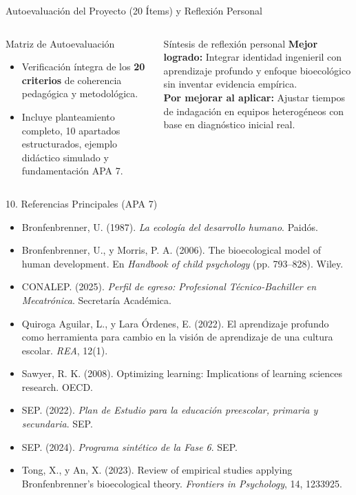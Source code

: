 \documentclass[aspectratio=169,spanish,xcolor=table]{beamer}
\begin{document}
\begin{frame}{Autoevaluación del Proyecto (20 Ítems) y Reflexión Personal}
  \begin{columns}[T]
      \begin{block}{Matriz de Autoevaluación}
        \scriptsize
        \begin{itemize}
          \item Verificación íntegra de los \textbf{20 criterios} de coherencia pedagógica y metodológica.
          \item Incluye planteamiento completo, 10 apartados estructurados, ejemplo didáctico simulado y fundamentación APA 7.
        \end{itemize}
      \end{block}
      \begin{block}{Síntesis de reflexión personal}
        \scriptsize
        \textbf{Mejor logrado:} Integrar identidad ingenieril con aprendizaje profundo y enfoque bioecológico sin inventar evidencia empírica.\\[0.15cm]
        \textbf{Por mejorar al aplicar:} Ajustar tiempos de indagación en equipos heterogéneos con base en diagnóstico inicial real.
      \end{block}
  \end{columns}
\end{frame}

\begin{frame}{10. Referencias Principales (APA 7)}
  \scriptsize\setlength{\parskip}{5pt}
  \begin{itemize}
    \item Bronfenbrenner, U. (1987). \textit{La ecología del desarrollo humano}. Paidós.
    \item Bronfenbrenner, U., y Morris, P. A. (2006). The bioecological model of human development. En \textit{Handbook of child psychology} (pp. 793--828). Wiley.
    \item CONALEP. (2025). \textit{Perfil de egreso: Profesional Técnico-Bachiller en Mecatrónica}. Secretaría Académica.
    \item Quiroga Aguilar, L., y Lara Órdenes, E. (2022). El aprendizaje profundo como herramienta para cambio en la visión de aprendizaje de una cultura escolar. \textit{REA}, 12(1).
    \item Sawyer, R. K. (2008). Optimizing learning: Implications of learning sciences research. OECD.
    \item SEP. (2022). \textit{Plan de Estudio para la educación preescolar, primaria y secundaria}. SEP.
    \item SEP. (2024). \textit{Programa sintético de la Fase 6}. SEP.
    \item Tong, X., y An, X. (2023). Review of empirical studies applying Bronfenbrenner's bioecological theory. \textit{Frontiers in Psychology}, 14, 1233925.
  \end{itemize}
\end{frame}
\end{document}
